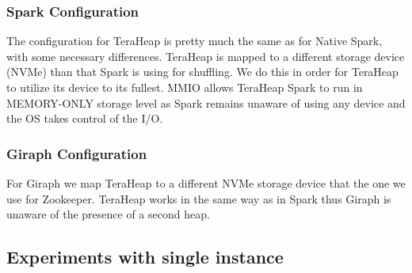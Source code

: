\subsubsection{Spark Configuration}
The configuration for TeraHeap is pretty much the same as for Native
Spark, with some necessary differences. TeraHeap
is mapped to a different storage device (NVMe) than that Spark is
using for shuffling. We do this in order for TeraHeap to utilize its
device to its fullest. MMIO allows TeraHeap Spark to run in
MEMORY-ONLY storage level as Spark remains unaware of using any device and
the OS takes control of the I/O.

\subsubsection{Giraph Configuration}
For Giraph we map TeraHeap to a different NVMe storage device that the one we
use for Zookeeper. TeraHeap works in the same way as in Spark
thus Giraph is unaware of the presence of a second heap.

\subsection{Experiments with single instance}

